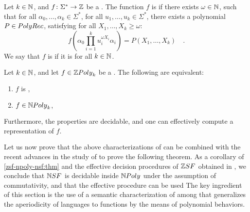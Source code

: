 \begin{definition}
    \label{k-combinatorial:def}
    Let $k \in \mathbb{N}$, and $f \colon \Sigma^* \to \mathbb{Z}$
    be a . The function $f$ is 
     if there exists $\omega \in \mathbb{N}$,
    such that
    for all
    $\alpha_0, \dots, \alpha_k \in \Sigma^*$,
    for all $u_1, \dots, u_k \in \Sigma^*$,
    there exists a polynomial $P \in \CorrectPoly$,  
    satisfying for all $X_1, \dots, X_k \geq \omega$:
    \begin{equation*}
        f
        \left(
            \alpha_0 \prod_{i = 1}^k u_i^{\omega X_i} \alpha_i
        \right)
        = 
        P(X_1, \dots, X_k) \quad .
    \end{equation*}
    We say that $f$ is 
    if it is  for all $k \in \mathbb{N}$.
\end{definition}

\begin{theorem}
    \label{decidable-n-poly:thm}
    Let $k \in \mathbb{N}$, and 
    let $f \in \ZPoly[k]$ be a  .
    The following are equivalent:
    \begin{enumerate}
        \item \label{f-combinatorial:item} $f$ is ,
        \item \label{f-npoly-combi:item} $f \in \NPoly[k]$,
    \end{enumerate}
    Furthermore, the properties are decidable,
    and one can effectively compute a representation of $f$.
\end{theorem}

Let us now prove that the above characterizations of 
 can be combined with the recent advances in
the study of  \cite{LOPEZ23b} to prove the
following theorem. As a corollary of \cref{zsf-npoly-nsf:thm} and the effective
decision procedures of $\ZSF$ obtained in \cite{LOPEZ23b}, we conclude that
$\NSF$ is decidable inside $\NPoly$ under the assumption of commutativity, and
that the effective procedure can be used The key ingredient of this section is
the use of a semantic characterization of  among  that generalizes the aperiodicity
of languages to functions by the means of polynomial behaviors.

